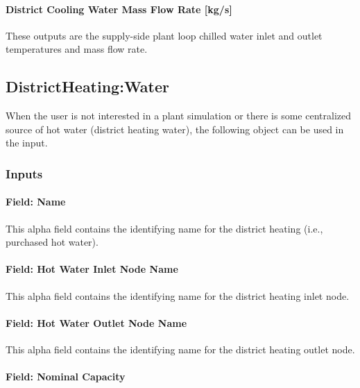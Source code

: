 \paragraph{District Cooling Water Mass Flow Rate {[}kg/s{]}}\label{district-cooling-mass-flow-rate-kgs}

These outputs are the supply-side plant loop chilled water inlet and outlet temperatures and mass flow rate.

\subsection{DistrictHeating:Water}\label{districtheating}

When the user is not interested in a plant simulation or there is some centralized source of hot water (district heating water), the following object can be used in the input.

\subsubsection{Inputs}\label{inputs-17-006}

\paragraph{Field: Name}\label{field-name-16-006}

This alpha field contains the identifying name for the district heating (i.e., purchased hot water).

\paragraph{Field: Hot Water Inlet Node Name}\label{field-hot-water-inlet-node-name-2}

This alpha field contains the identifying name for the district heating inlet node.

\paragraph{Field: Hot Water Outlet Node Name}\label{field-hot-water-outlet-node-name-2}

This alpha field contains the identifying name for the district heating outlet node.

\paragraph{Field: Nominal Capacity}\label{field-nominal-capacity-11}

